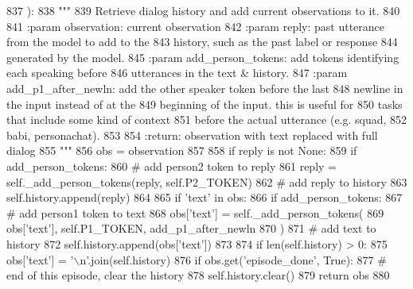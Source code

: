 \begin{DoxyCode}
837     ):
838         \textcolor{stringliteral}{"""}
839 \textcolor{stringliteral}{        Retrieve dialog history and add current observations to it.}
840 \textcolor{stringliteral}{}
841 \textcolor{stringliteral}{        :param observation:        current observation}
842 \textcolor{stringliteral}{        :param reply:              past utterance from the model to add to the}
843 \textcolor{stringliteral}{                                   history, such as the past label or response}
844 \textcolor{stringliteral}{                                   generated by the model.}
845 \textcolor{stringliteral}{        :param add\_person\_tokens:  add tokens identifying each speaking before}
846 \textcolor{stringliteral}{                                   utterances in the text & history.}
847 \textcolor{stringliteral}{        :param add\_p1\_after\_newln: add the other speaker token before the last}
848 \textcolor{stringliteral}{                                   newline in the input instead of at the}
849 \textcolor{stringliteral}{                                   beginning of the input. this is useful for}
850 \textcolor{stringliteral}{                                   tasks that include some kind of context}
851 \textcolor{stringliteral}{                                   before the actual utterance (e.g. squad,}
852 \textcolor{stringliteral}{                                   babi, personachat).}
853 \textcolor{stringliteral}{}
854 \textcolor{stringliteral}{        :return: observation with text replaced with full dialog}
855 \textcolor{stringliteral}{        """}
856         obs = observation
857 
858         \textcolor{keywordflow}{if} reply \textcolor{keywordflow}{is} \textcolor{keywordflow}{not} \textcolor{keywordtype}{None}:
859             \textcolor{keywordflow}{if} add\_person\_tokens:
860                 \textcolor{comment}{# add person2 token to reply}
861                 reply = self.\_add\_person\_tokens(reply, self.P2\_TOKEN)
862             \textcolor{comment}{# add reply to history}
863             self.history.append(reply)
864 
865         \textcolor{keywordflow}{if} \textcolor{stringliteral}{'text'} \textcolor{keywordflow}{in} obs:
866             \textcolor{keywordflow}{if} add\_person\_tokens:
867                 \textcolor{comment}{# add person1 token to text}
868                 obs[\textcolor{stringliteral}{'text'}] = self.\_add\_person\_tokens(
869                     obs[\textcolor{stringliteral}{'text'}], self.P1\_TOKEN, add\_p1\_after\_newln
870                 )
871             \textcolor{comment}{# add text to history}
872             self.history.append(obs[\textcolor{stringliteral}{'text'}])
873 
874         \textcolor{keywordflow}{if} len(self.history) > 0:
875             obs[\textcolor{stringliteral}{'text'}] = \textcolor{stringliteral}{'\(\backslash\)n'}.join(self.history)
876         \textcolor{keywordflow}{if} obs.get(\textcolor{stringliteral}{'episode\_done'}, \textcolor{keyword}{True}):
877             \textcolor{comment}{# end of this episode, clear the history}
878             self.history.clear()
879         \textcolor{keywordflow}{return} obs
880 
\end{DoxyCode}
